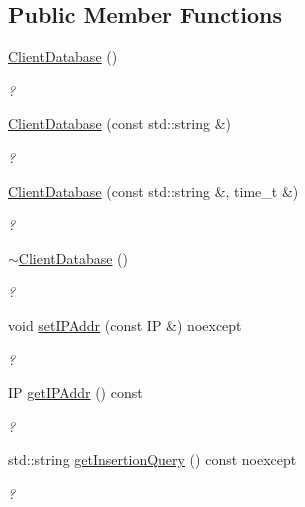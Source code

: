 \subsection*{Public Member Functions}
\begin{DoxyCompactItemize}
\item 
\hyperlink{classdb_1_1_client_database_abdb82edc1ea955df62b5514e40397622}{Client\+Database} ()
\begin{DoxyCompactList}\small\item\em ? \end{DoxyCompactList}\item 
\hyperlink{classdb_1_1_client_database_ad35c5aec453015e7785079f70fd20bb4}{Client\+Database} (const std\+::string \&)
\begin{DoxyCompactList}\small\item\em ? \end{DoxyCompactList}\item 
\hyperlink{classdb_1_1_client_database_a59973465f454ada5665d274c7565a4ec}{Client\+Database} (const std\+::string \&, time\+\_\+t \&)
\begin{DoxyCompactList}\small\item\em ? \end{DoxyCompactList}\item 
\hyperlink{classdb_1_1_client_database_af0249c4d0a723a6a39684895f226e40d}{$\sim$\+Client\+Database} ()
\begin{DoxyCompactList}\small\item\em ? \end{DoxyCompactList}\item 
void \hyperlink{classdb_1_1_client_database_aac37cb276baf5a7e63d87a7ceb2f70ca}{set\+I\+P\+Addr} (const IP \&) noexcept
\begin{DoxyCompactList}\small\item\em ? \end{DoxyCompactList}\item 
IP \hyperlink{classdb_1_1_client_database_a7300e226455d344798c75c3232b1218a}{get\+I\+P\+Addr} () const
\begin{DoxyCompactList}\small\item\em ? \end{DoxyCompactList}\item 
std\+::string \hyperlink{classdb_1_1_client_database_ad342a032236484edb6df718d7ee746b1}{get\+Insertion\+Query} () const noexcept
\begin{DoxyCompactList}\small\item\em ? \end{DoxyCompactList}\item 

\end{DoxyCompactItemize}
